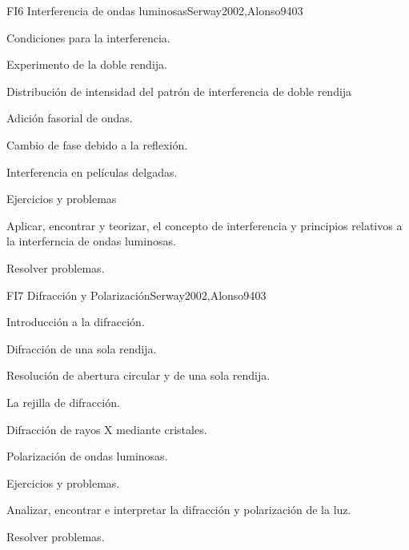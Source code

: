 \begin{syllabus}
\begin{unit}{FI6 Interferencia de ondas luminosas}{}{Serway2002,Alonso94}{0}{3}
\begin{topics}
      \item Condiciones para la interferencia.
        \item Experimento de la doble rendija.
        \item Distribución de intensidad del patrón
              de interferencia de doble rendija
        \item Adición fasorial de ondas.
        \item Cambio de fase debido a la reflexión.
        \item Interferencia en películas delgadas.
        \item Ejercicios y problemas
   \end{topics}
   \begin{learningoutcomes}
      \item Aplicar, encontrar y teorizar, el concepto de interferencia y
            principios relativos a la interferncia de ondas luminosas.
      \item Resolver problemas.
   \end{learningoutcomes}
\end{unit}

\begin{unit}{FI7 Difracción y Polarización}{}{Serway2002,Alonso94}{0}{3}
\begin{topics}
      \item Introducción a la difracción.
      \item Difracción de una sola rendija.
      \item Resolución de abertura circular y de una sola rendija.
      \item La rejilla de difracción.
      \item Difracción de rayos X mediante cristales.
      \item Polarización de ondas luminosas.
      \item Ejercicios y problemas.
   \end{topics}

   \begin{learningoutcomes}
      \item Analizar, encontrar e interpretar la difracción y polarización de la luz.
      \item Resolver problemas.
   \end{learningoutcomes}
\end{unit}

\begin{coursebibliography}
\end{coursebibliography}

\end{syllabus}
